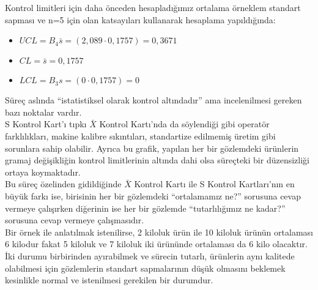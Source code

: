 Kontrol limitleri için daha önceden hesapladığımız ortalama örneklem standart sapması ve n=5 için olan katsayıları kullanarak hesaplama yapıldığında: 

\begin{itemize}
	\centering
	\item 
	$UCL=B_4 \bar{s}=(2,089 \cdot 0,1757)=0,3671$
	\item
	$CL=\bar{s}=0,1757$
	\item
	$LCL=B_3 {s}=(0 \cdot 0,1757)=0$
\end{itemize}


Süreç aslında “istatistiksel olarak kontrol altındadır” ama incelenilmesi gereken bazı noktalar vardır.\\

S Kontrol Kart'ı tıpkı $\bar{X}$ Kontrol Kartı'nda da söylendiği gibi operatör farklılıkları, makine kalibre sıkıntıları, standartize edilmemiş üretim gibi sorunlara sahip olabilir. Ayrıca bu grafik, yapılan her bir gözlemdeki ürünlerin gramaj değişikliğin kontrol limitlerinin altında dahi olsa süreçteki bir düzensizliği ortaya koymaktadır.\\

Bu süreç özelinden gidildiğinde $\bar{X}$ Kontrol Kartı ile S Kontrol Kartları'nın en büyük farkı ise, birisinin her bir gözlemdeki “ortalamamız ne?” sorusuna cevap vermeye çalışırken diğerinin ise her bir gözlemde “tutarlılığımız ne kadar?”  sorusuna cevap vermeye çalışmasıdır. \\

Bir örnek ile anlatılmak istenilirse, 2 kiloluk ürün ile 10 kiloluk ürünün ortalaması 6 kilodur fakat 5 kiloluk ve 7 kiloluk iki ürününde ortalaması da 6 kilo olacaktır. İki durumu birbirinden ayırabilmek ve sürecin tutarlı, ürünlerin aynı kalitede olabilmesi için gözlemlerin standart sapmalarının düşük olmasını beklemek kesinlikle normal ve istenilmesi gerekilen bir durumdur.\\

